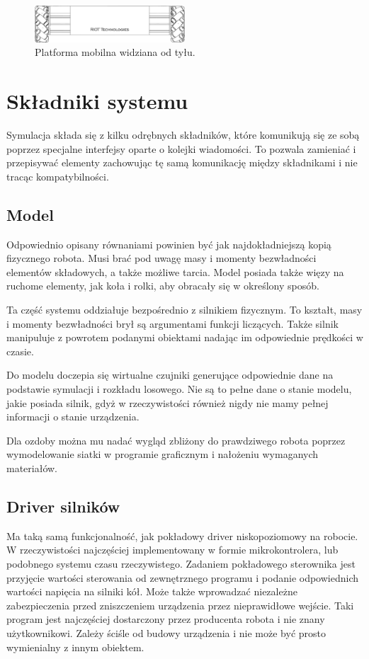 \begin{figure}
\centering
 \includegraphics[width=0.5\textwidth]{graphics/base_front.pdf}
\caption{Platforma mobilna widziana od tyłu.}
\end{figure} 



\section{Składniki systemu}
Symulacja składa się z kilku odrębnych składników, które komunikują się ze sobą poprzez specjalne interfejsy oparte o kolejki wiadomości.
To pozwala zamieniać i przepisywać elementy zachowując tę samą komunikację między składnikami i nie tracąc kompatybilności.

\subsection{Model}
 Odpowiednio opisany równaniami powinien być jak najdokładniejszą kopią fizycznego robota.
 Musi brać pod uwagę masy i momenty bezwładności elementów składowych, a także możliwe tarcia.
 Model posiada także więzy na ruchome elementy, jak koła i rolki, aby obracały się w określony sposób.
 
 Ta część systemu oddziałuje bezpośrednio z silnikiem fizycznym. 
 To kształt, masy i momenty bezwładności brył są argumentami funkcji liczących.
 Także silnik manipuluje z powrotem podanymi obiektami nadając im odpowiednie prędkości w czasie.
 
 Do modelu doczepia się wirtualne czujniki generujące odpowiednie dane na podstawie symulacji i rozkładu losowego.
 Nie są to pełne dane o stanie modelu, jakie posiada silnik, gdyż w rzeczywistości również nigdy nie mamy pełnej informacji o stanie urządzenia.
 
 Dla ozdoby można mu nadać wygląd zbliżony do prawdziwego robota poprzez wymodelowanie siatki w programie graficznym i nałożeniu wymaganych materiałów.

 \subsection{Driver silników}
 Ma taką samą funkcjonalność, jak pokładowy driver niskopoziomowy na robocie.
 W rzeczywistości najczęściej implementowany w formie mikrokontrolera, lub podobnego systemu czasu rzeczywistego.
 Zadaniem pokładowego sterownika jest przyjęcie wartości sterowania od zewnętrznego programu i podanie odpowiednich wartości napięcia na silniki kół.
 Może także wprowadzać niezależne zabezpieczenia przed zniszczeniem urządzenia przez nieprawidłowe wejście.
 Taki program jest najczęściej dostarczony przez producenta robota i nie znany użytkownikowi.
 Zależy ściśle od budowy urządzenia i nie może być prosto wymienialny z innym obiektem.
 
